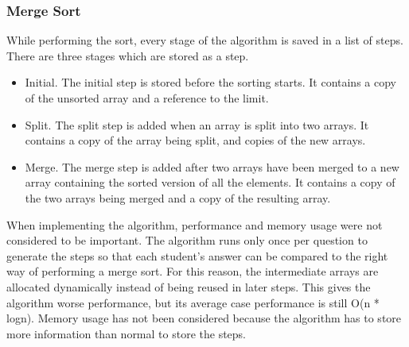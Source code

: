\subsubsection{Merge Sort}
While performing the sort, every stage of the algorithm is saved in a list of steps. There are three stages which are stored as a step.
\begin{itemize}
    \item Initial. The initial step is stored before the sorting starts. It contains a copy of the unsorted array and a reference to the limit.
    \item Split. The split step is added when an array is split into two arrays. It contains a copy of the array being split, and copies of the new arrays.
    \item Merge. The merge step is added after two arrays have been merged to a new array containing the sorted version of all the elements. It contains a copy of the two arrays being merged and a copy of the resulting array.
\end{itemize}
When implementing the algorithm, performance and memory usage were not considered to be important. The algorithm runs only once per question to generate the steps so that each student's answer can be compared to the right way of performing a merge sort. For this reason, the intermediate arrays are allocated dynamically instead of being reused in later steps. This gives the algorithm worse performance, but its average case performance is still O(n * logn). Memory usage has not been considered because the algorithm has to store more information than normal to store the steps.